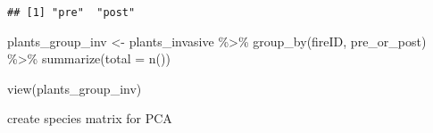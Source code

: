 \documentclass[
]{article}
\newenvironment{Shaded}{\begin{snugshade}}{\end{snugshade}}
\newcommand{\AttributeTok}[1]{\textcolor[rgb]{0.77,0.63,0.00}{#1}}
\newcommand{\CommentTok}[1]{\textcolor[rgb]{0.56,0.35,0.01}{\textit{#1}}}
\newcommand{\FunctionTok}[1]{\textcolor[rgb]{0.00,0.00,0.00}{#1}}
\newcommand{\NormalTok}[1]{#1}
\newcommand{\OtherTok}[1]{\textcolor[rgb]{0.56,0.35,0.01}{#1}}
\newcommand{\SpecialCharTok}[1]{\textcolor[rgb]{0.00,0.00,0.00}{#1}}
\newcommand{\StringTok}[1]{\textcolor[rgb]{0.31,0.60,0.02}{#1}}
\begin{document}
\begin{Shaded}
\end{Shaded}

\begin{verbatim}
## [1] "pre"  "post"
\end{verbatim}

\begin{Shaded}
\begin{Highlighting}[]
\NormalTok{plants\_group\_inv }\OtherTok{\textless{}{-}}\NormalTok{  plants\_invasive }\SpecialCharTok{\%\textgreater{}\%} 
  \FunctionTok{group\_by}\NormalTok{(fireID, pre\_or\_post) }\SpecialCharTok{\%\textgreater{}\%} 
  \FunctionTok{summarize}\NormalTok{(}\AttributeTok{total =} \FunctionTok{n}\NormalTok{())}

\FunctionTok{view}\NormalTok{(plants\_group\_inv)}
\end{Highlighting}
\end{Shaded}

create species matrix for PCA
\end{document}
